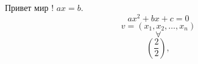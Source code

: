 


    Привет мир ! $ax = b$.
    \[
    ax^2 + bx + c = 0
    \]
    \[
    v = (x_{1}, x_{2}, \dots, x_{n})
    \]
    \[\forall\]
    \[
    \left (\frac{2}{2} \right), 
    \]
